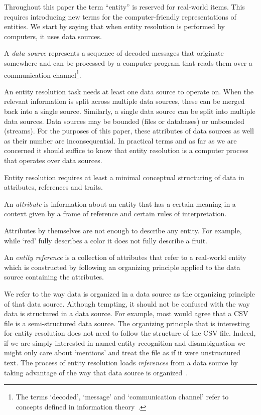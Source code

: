 Throughout this paper the term ``entity'' is reserved for real-world items.
This requires introducing new terms for the computer-friendly representations of
entities.
We start by saying that when entity resolution is performed by computers, it
uses data sources.

\begin{defn}
    A \textit{data source} represents a sequence of decoded messages
    that originate somewhere and can be processed by a computer program that
    reads them over a communication channel\footnote{The terms `decoded', `message' and `communication channel' refer to concepts
    defined in information theory~\cite{ash2012it}.}.
\end{defn}



An entity resolution task needs at least one data source to operate on.
When the relevant information is split across multiple data sources, these
can be merged back into a single source.
Similarly, a single data source can be split into multiple data sources.
Data sources may be bounded (files or databases) or unbounded (streams).
For the purposes of this paper, these attributes of data sources as well as
their number are inconsequential.
In practical terms and as far as we are concerned it should suffice to know that
entity resolution is a computer process that operates over data sources.

Entity resolution requires at least a minimal conceptual structuring of data in
attributes, references and traits.

\begin{defn}
    An \textit{attribute} is information about an entity that has a certain
    meaning in a context given by a frame of reference and certain rules of
    interpretation.
\end{defn}

Attributes by themselves are not enough to describe any entity.
For example, while `red' fully describes a color it does not fully describe a 
fruit.

\begin{defn}
    An \textit{entity reference} is a collection of attributes that refer
    to a real-world entity which is constructed by following an organizing
    principle applied to the data source containing the attributes.
\end{defn}

We refer to the way data is organized in a data source as the organizing
principle of that data source.
Although tempting, it should not be confused with the way data is structured in
a data source.
For example, most would agree that a CSV file is a semi-structured data source.
The organizing principle that is interesting for entity resolution does not need
to follow the structure of the CSV file.
Indeed, if we are simply interested in named entity recognition and
disambiguation we might only care about `mentions' and treat the file as if it
were unstructured text.
The process of entity resolution loads \textit{references} from a data source by
taking advantage of the way that data source is organized~\cite{Ben2009Swoosh}.

